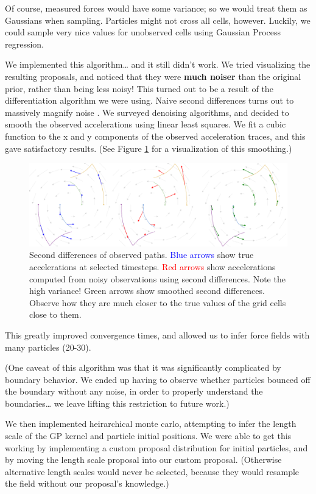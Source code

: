 \documentclass[11pt]{article}
\begin{document}
Of course, measured forces would have some variance; so we would treat them as Gaussians when sampling. Particles might not cross all cells, however. Luckily, we could sample very nice values for unobserved cells using Gaussian Process regression.

We implemented this algorithm\ldots{} and it still didn't work. We tried visualizing the resulting proposals, and noticed that they were \textbf{much noiser} than the original prior, rather than being less noisy! This  turned out to be a result of the differentiation algorithm we were using. Naive second differences turns out to massively magnify noise \citep{NumDiffNonsmooth}. We surveyed denoising algorithms, and decided to smooth the observed accelerations using linear least squares. We fit a cubic function to the x and y components of the observed acceleration traces, and this gave satisfactory results. (See Figure \ref{fig:obsall} for a visualization of this smoothing.)

\begin{figure}[htbp]
\centering
\includegraphics[width=6in]{./obsall.png}
\caption{\label{fig:obsall}Second differences of observed paths. \textcolor{blue}{Blue arrows} show true accelerations at selected timesteps. \textcolor{red}{Red arrows} show accelerations computed from noisy observations using second differences. Note the high variance! \textcolor{goodgreen}{Green arrows} show smoothed second differences. Observe how they are much closer to the true values of the grid cells close to them.}
\end{figure}

This greatly improved convergence times, and allowed us to infer force fields with many particles (20-30).

(One caveat of this algorithm was that it was significantly complicated by boundary behavior. We ended up having to observe whether particles bounced off the boundary without any noise, in order to properly understand the boundaries\ldots{} we leave lifting this restriction to future work.)

We then implemented heirarchical monte carlo, attempting to infer the length scale of the GP kernel and particle initial positions. We were able to get this working by implementing a custom proposal distribution for initial particles, and by moving the length scale proposal into our custom proposal. (Otherwise alternative length scales would never be selected, because they would resample the field without our proposal's knowledge.)
\end{document}
